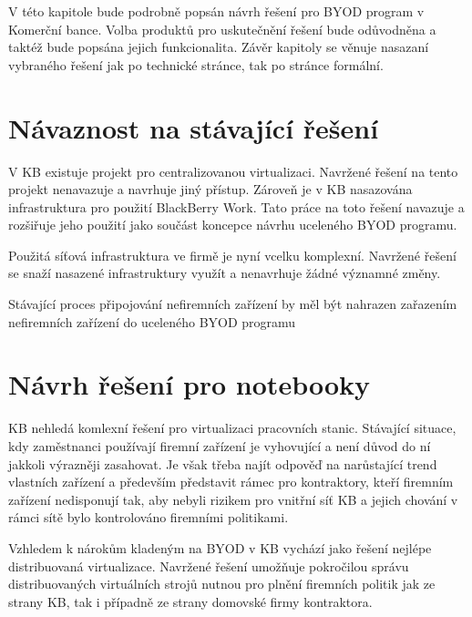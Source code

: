 

V této kapitole bude podrobně popsán návrh řešení pro BYOD program v Komerční bance. Volba produktů pro uskutečnění řešení bude odůvodněna a taktéž bude popsána jejich funkcionalita. Závěr kapitoly se věnuje nasazaní vybraného řešení jak po technické stránce, tak po stránce formální. 


\section{Návaznost na stávající řešení}
V KB existuje projekt pro centralizovanou virtualizaci. Navržené řešení na tento projekt nenavazuje a navrhuje jiný přístup. Zároveň je v KB nasazována infrastruktura pro použití BlackBerry Work. Tato práce na toto řešení navazuje a rozšiřuje jeho použití jako součást koncepce návrhu uceleného BYOD programu. 

Použitá síťová infrastruktura ve firmě je nyní vcelku komplexní. Navržené řešení se snaží nasazené infrastruktury využít a nenavrhuje žádné významné změny. 

Stávající proces připojování nefiremních zařízení by měl být nahrazen zařazením nefiremních zařízení do uceleného BYOD programu


\section{Návrh řešení pro notebooky}

KB nehledá komlexní řešení pro virtualizaci pracovních stanic. Stávající situace, kdy zaměstnanci používají firemní zařízení je vyhovující a není důvod do ní jakkoli výrazněji zasahovat. Je však třeba najít odpověď na narůstající trend vlastních zařízení a především představit rámec pro kontraktory, kteří firemním zařízení nedisponují tak, aby nebyli rizikem pro vnitřní síť KB a jejich chování v rámci sítě bylo kontrolováno firemními politikami.


Vzhledem k nárokům kladeným na BYOD v KB vychází jako řešení nejlépe distribuovaná virtualizace. Navržené řešení umožňuje pokročilou správu distribuovaných virtuálních strojů nutnou pro plnění firemních politik jak ze strany KB, tak i případně ze strany domovské firmy kontraktora.

